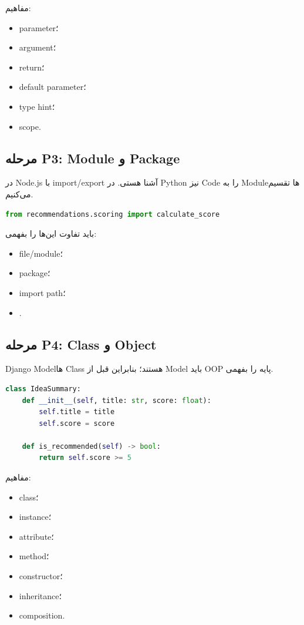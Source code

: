 مفاهیم:
\begin{itemize}
  \item parameter؛
  \item argument؛
  \item return؛
  \item default parameter؛
  \item type hint؛
  \item scope.
\end{itemize}

\subsection{مرحله P3: Module و Package}

در Node.js با import/export آشنا هستی. در Python نیز Code را به Moduleها تقسیم می‌کنیم.

\begin{latin}
\begin{lstlisting}[language=Python]
from recommendations.scoring import calculate_score
\end{lstlisting}
\end{latin}

باید تفاوت این‌ها را بفهمی:
\begin{itemize}
  \item file/module؛
  \item package؛
  \item import path؛
  \item {}.
\end{itemize}

\subsection{مرحله P4: Class و Object}

Django Modelها Class هستند؛ بنابراین قبل از Model باید OOP پایه را بفهمی.

\begin{latin}
\begin{lstlisting}[language=Python]
class IdeaSummary:
    def __init__(self, title: str, score: float):
        self.title = title
        self.score = score

    def is_recommended(self) -> bool:
        return self.score >= 5
\end{lstlisting}
\end{latin}

مفاهیم:
\begin{itemize}
  \item class؛
  \item instance؛
  \item attribute؛
  \item method؛
  \item constructor؛
  \item inheritance؛
  \item composition.
\end{itemize}

